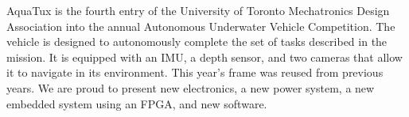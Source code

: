 
AquaTux is the fourth entry of the University of Toronto Mechatronics
Design Association into the annual Autonomous Underwater Vehicle
Competition.  The vehicle is designed to autonomously complete
the set of tasks described in the mission\footnotemark[1].
It is equipped with an IMU, a depth sensor,
and two cameras that allow it to navigate in its environment.
This year's frame was reused from previous years.
We are proud to present new electronics, a new power system,
a new embedded system using an FPGA, and new software.
